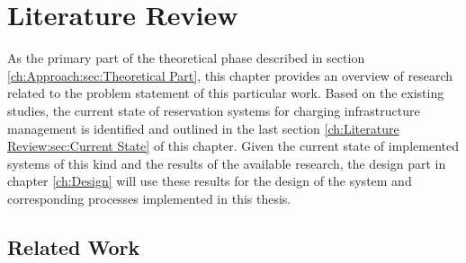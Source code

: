 

\chapter{Literature Review}
\label{ch:Literature Review}

As the primary part of the theoretical phase described in section \ref{ch:Approach:sec:Theoretical Part}, this chapter provides an overview of research related to the problem statement of this particular work.
Based on the existing studies, the current state of reservation systems for charging infrastructure management is identified and outlined in the last section \ref{ch:Literature Review:sec:Current State} of this chapter.
Given the current state of implemented systems of this kind and the results of the available research, the design part in chapter \ref{ch:Design} will use these results for the design of the system and corresponding processes implemented in this thesis.

\section{Related Work}
\label{ch:Literature Review:sec:Related Work}


